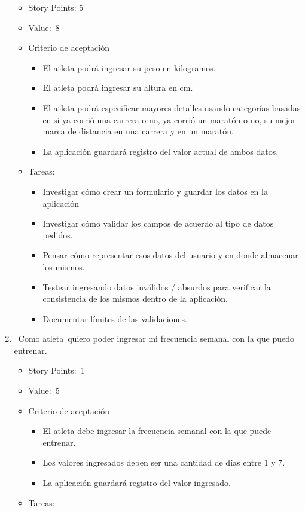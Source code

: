 \begin{enumerate}
  \begin{itemize}
  \item
    Story Points: 5
  \item
    Value:~8
  \item
    Criterio de aceptación

    \begin{itemize}
    \item
      El atleta podrá ingresar su peso en kilogramos.
    \item
      El atleta podrá ingresar su altura en cm.
    \item
      El atleta podrá especificar mayores detalles usando categorías
      basadas en si ya corrió una carrera o no, ya corrió un maratón o
      no, su mejor marca de distancia en una carrera y en un maratón.
    \item
      La aplicación guardará registro del valor actual de ambos datos.
    \end{itemize}
  \item
    Tareas:

    \begin{itemize}
    \item
      Investigar cómo crear un formulario y guardar los datos en la
      aplicación
    \item
      Investigar cómo validar los campos de acuerdo al tipo de datos
      pedidos.
    \item
      Pensar cómo representar esos datos del usuario y en donde
      almacenar los mismos.
    \item
      Testear ingresando datos inválidos / absurdos para verificar la
      consistencia de los mismos dentro de la aplicación.
    \item
      Documentar límites de las validaciones.
    \end{itemize}
  \end{itemize}
\item
  ~Como atleta~quiero poder ingresar mi frecuencia semanal con la que
  puedo entrenar.

  \begin{itemize}
  \item
    Story Points:~1
  \item
    Value:~5
  \item
    Criterio de aceptación

    \begin{itemize}
    \item
      El atleta debe ingresar la frecuencia semanal con la que puede
      entrenar.
    \item
      Los valores ingresados deben ser una cantidad de días entre 1 y 7.
    \item
      La aplicación guardará registro del valor ingresado.
    \end{itemize}
  \item
    Tareas:


\end{itemize}
\end{enumerate}
